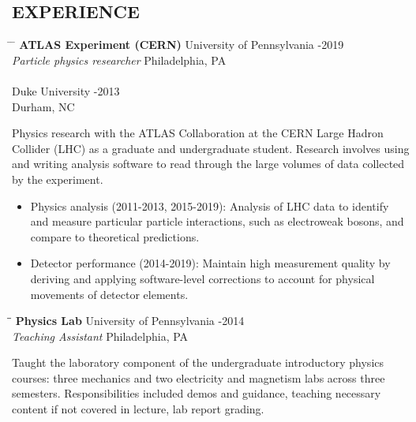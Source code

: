 \documentclass{res}
\begin{document}
\begin{resume}
\section{EXPERIENCE}\vspace{-5pt}
   \begin{tabbing}
   \hspace{2.5in}\= \hspace{2.85in} \= \kill %
    {\bf ATLAS Experiment (CERN)} \>University of Pennsylvania -2019\\
    {\it Particle physics researcher} \> Philadelphia, PA \\
    \\
    \> Duke University -2013 \\
    \> Durham, NC
   \end{tabbing}\vspace{-18pt}
   Physics research with the ATLAS Collaboration at the CERN Large Hadron Collider (LHC) as a graduate and undergraduate student.
   Research involves using and writing analysis software to read through the large volumes of data collected by the experiment.
   \begin{itemize}
     \item Physics analysis (2011-2013, 2015-2019): Analysis of LHC data to identify and measure particular particle interactions, such as electroweak bosons, and compare to theoretical predictions.
     \item Detector performance (2014-2019): Maintain high measurement quality by deriving and applying software-level corrections to account for physical movements of detector elements.
   \end{itemize}

   \vspace{-0.1in}	
   \begin{tabbing}
     \hspace{2.5in}\= \hspace{2.9in}\= \kill %
    {\bf Physics Lab} \>University of Pennsylvania     -2014\\
    {\it Teaching Assistant}  \>Philadelphia, PA
   \end{tabbing}\vspace{-18pt}      %
   Taught the laboratory component of the undergraduate introductory physics courses: three mechanics and two electricity and magnetism labs across three semesters.
   Responsibilities included demos and guidance, teaching necessary content if not covered in lecture, lab report grading.


\end{resume}
\end{document}
